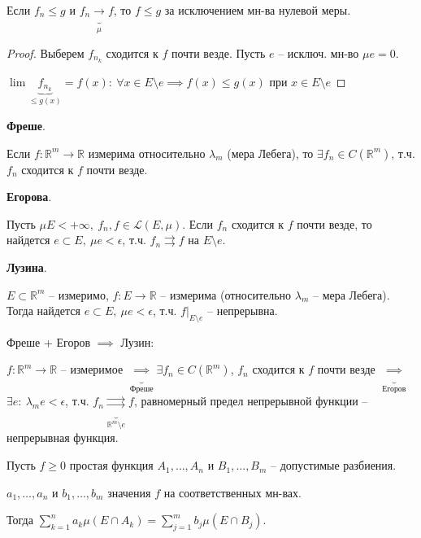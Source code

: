 \begin{consequence}
    Если $f_n \leq g$ и $f_n \underbrace{\rightarrow}_{\mu} f$, то $f \leq g$ за исключением мн-ва нулевой меры.
\end{consequence}
\begin{proof}
    Выберем $f_{n_k}$ сходится к $f$ почти везде. Пусть $e$ -- исключ. мн-во $\mu e = 0$.

    $\lim \underbrace{f_{n_k}}_{\leq g(x)} = f(x): \ \forall x \in E \setminus e \implies f(x) \leq g(x)$ при $x \in E \setminus e$
\end{proof}

\begin{theorem}
    \textbf{Фреше}.

    Если $f: \mathbb{R}^{m} \rightarrow \mathbb{R}$ измерима относительно $\lambda_m$ (мера Лебега), то $\exists f_n \in C(\mathbb{R}^m)$, т.ч. $f_n$ сходится к $f$ почти везде.
\end{theorem}


\begin{theorem}
    \textbf{Егорова}.

    Пусть $\mu E < + \infty, \ f_n, f \in \mathscr{L}(E, \mu)$. Если $f_n$ сходится к $f$ почти везде, то найдется $e \subset E, \ \mu e < \epsilon$, т.ч. $f_n \rightrightarrows f$ на $E \setminus e$.
\end{theorem}

\begin{theorem}
    \textbf{Лузина}.

    $E \subset \mathbb{R}^m$ -- измеримо, $f: E \rightarrow \mathbb{R}$  -- измерима (относительно $\lambda_m$ -- мера Лебега). Тогда найдется $e \subset E, \ \mu e < \epsilon$, т.ч. $f|_{E \setminus e}$ -- непрерывна.


    Фреше + Егоров $\implies$ Лузин:

    $f: \mathbb{R}^m \rightarrow \mathbb{R}$ -- измеримое $\underbrace{\implies}_{\text{Фреше}} \exists f_n \in C(\mathbb{R}^m)$, $f_n$ сходится к $f$ почти везде $\underbrace{\implies}_{\text{Егоров}}$ $\exists e: \ \lambda_m e < \epsilon$, т.ч. $f_n \underbrace{\rightrightarrows}_{\mathbb{R}^m \setminus e} f$, равномерный предел непрерывной функции -- непрерывная функция.
\end{theorem}


\begin{lemma}
    Пусть $f \geq 0$ простая функция $A_1, \dots, A_n$ и $B_1, \dots, B_m$ -- допустимые разбиения.

    $a_1, \dots, a_n$ и $b_1, \dots, b_m$ значения $f$ на соответственных мн-вах.

    Тогда $\sum_{k=1}^{n} a_k \mu (E \cap A_k) = \sum_{j=1}^{m} b_j \mu (E \cap B_j)$.
\end{lemma}

